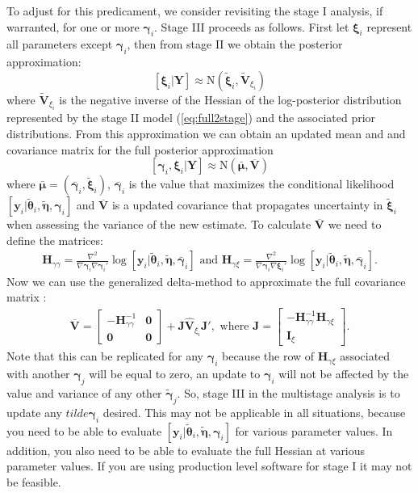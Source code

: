 \documentclass[12pt]{article}
\newcommand{\by}{\mathbf{y}}
\newcommand{\bt}{\boldsymbol{\theta}}
\newcommand{\bn}{\boldsymbol{\eta}}
\newcommand{\bg}{\boldsymbol{\gamma}}
\newcommand{\bm}{\boldsymbol{\mu}}
\newcommand{\bxi}{\boldsymbol{\xi}}
\newcommand{\bV}{\mathbf{V}}
\newcommand{\tN}{\text{N}}
\newcommand{\bY}{\mathbf{Y}}
\newcommand{\bz}{\mathbf{0}}
\begin{document}
To adjust for this predicament, we consider revisiting the stage I analysis, if warranted, for one or more $\bg_i$. Stage III proceeds as follows. First let $\bxi_i$ represent all parameters except $\bg_i$, then from stage II we obtain the posterior approximation:
\[
[\bxi_i|\bY] \approx \tN(\tilde{\bxi}_i, \widetilde{\bV}_{\xi_i})
\]  
where $\widetilde{\bV}_{\xi_i}$ is the negative inverse of the Hessian of the log-posterior distribution represented by the stage II model (\ref{eq:full2stage}) and the associated prior distributions. From this approximation we can obtain an updated mean and and covariance matrix for the full posterior approximation
\[
[\bg_i ,\bxi_i|\bY] \approx \tN(\bar{\bm}, \overline{\bV})
\]
where $\bar{\bm} = (\bar{\bg}_i,\tilde{\bxi}_i)$, $\bar{\bg}_i$ is the value that maximizes the conditional likelihood $[\by_i|\tilde{\bt}_i, \tilde{\bn}, \bg_i]$ and $\overline{\bV}$ is a updated covariance that propagates uncertainty in $\tilde{\bxi}_i$ when assessing the variance of the new estimate. To calculate $\overline{\bV}$ we need to define the matrices: 
\[
\begin{gathered}
\mathbf{H}_{\gamma\gamma} = \frac{\nabla^2}{\nabla \bg_i \nabla \bg_i'} \log[\by_i|\tilde{\bt}_i, \tilde{\bn}, \bar{\bg}_i] 
\text{ and }
\mathbf{H}_{\gamma\xi} = \frac{\nabla^2}{\nabla \bg_i \nabla \bxi_i'} \log[\by_i|\tilde{\bt}_i, \tilde{\bn}, \bar{\bg}_i].
\end{gathered}
\] 
Now we can use the generalized delta-method to approximate the full covariance matrix \citep{kass1989approximate, skaug2006automatic}:
\[
\begin{gathered}
\overline{\bV} = \left[\begin{array}{cc} -\mathbf{H}_{\gamma\gamma}^{-1} & \bz \\ \bz & \bz \end{array}\right] + 
\mathbf{J} \widehat{\bV}_{\xi_i} \mathbf{J}',  \text{ where } 
\mathbf{J} = \left[ \begin{array}{c} -\mathbf{H}_{\gamma\gamma}^{-1}\mathbf{H}_{\gamma\xi} \\ \mathbf{I}_{\xi} \end{array}\right].
\end{gathered}
\]
Note that this can be replicated for any $\bg_i$ because the row of $\mathbf{H}_{\gamma\xi}$ associated with another $\bg_j$ will be equal to zero, an update to $\bg_i$ will not be affected by the value and variance of any other $\tilde{\bg}_j$. So, stage III in the multistage analysis is to update any $tilde{\bg}_i$ desired. This may not be applicable in all situations, because you need to be able to evaluate $[\by_i|\tilde{\bt}_i, \tilde{\bn}, \bg_i]$ for various parameter values. In addition, you also need to be able to evaluate the full Hessian at various parameter values. If you are using production level software for stage I it may not be feasible. 
\end{document}
